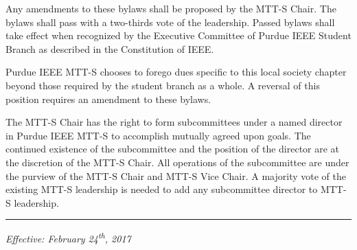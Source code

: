 \documentclass[12pt]{constitution}
\begin{document}
\label{art:amend}

Any amendments to these bylaws shall be proposed by the MTT-S Chair. The bylaws shall pass with a two-thirds vote of the leadership. Passed bylaws shall take effect when recognized by the Executive Committee of Purdue IEEE Student Branch as described in the Constitution of IEEE.


\label{art:dues}

Purdue IEEE MTT-S chooses to forego dues specific to this local society chapter beyond those required by the student branch as a whole. A reversal of this position requires an amendment to these bylaws.


\label{art:subcommittee}

The MTT-S Chair has the right to form subcommittees under a named director in Purdue IEEE MTT-S to accomplish mutually agreed upon goals. The continued existence of the subcommittee and the position of the director are at the discretion of the MTT-S Chair. All operations of the subcommittee are under the purview of the MTT-S Chair and MTT-S Vice Chair. A majority vote of the existing MTT-S leadership is needed to add any subcommittee director to MTT-S leadership.



\vspace{12pt}
\hrule

\textit{Effective: February 24\textsuperscript{th}, 2017}


\setcounter{tocdepth}{1}
\listoftodos %
\end{document}
